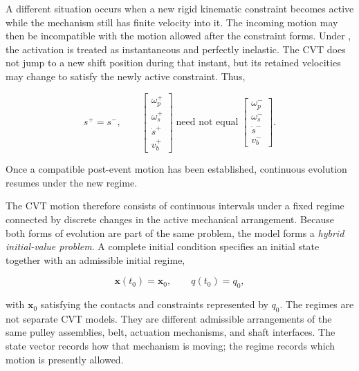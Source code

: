 \documentclass[11pt]{report}
\numberwithin{equation}{section}
\newcommand{\vect}[1]{\bm{#1}}
\newcounter{assump}
\begin{document}
A different situation occurs when a new rigid kinematic constraint becomes
active while the mechanism still has finite velocity into it. The incoming
motion may then be incompatible with the motion allowed after the constraint
forms. Under , the activation is
treated as instantaneous and perfectly inelastic. The CVT does not jump to a 
new shift position during that instant, but its retained velocities may change 
to satisfy the newly active constraint. Thus,

\begin{equation}
    s^{+}=s^{-},
    \qquad
    \begin{bmatrix}
        \omega_p^{+}\\
        \omega_s^{+}\\
        \dot{s}^{+}\\
        v_b^{+}
    \end{bmatrix}
    \;\text{need not equal}\;
    \begin{bmatrix}
        \omega_p^{-}\\
        \omega_s^{-}\\
        \dot{s}^{-}\\
        v_b^{-}
    \end{bmatrix}.
    \label{eq:impulsive_regime_transition}
\end{equation}

Once a compatible post-event motion has been established, continuous evolution 
resumes under the new regime.

The CVT motion therefore consists of continuous intervals under a fixed regime
connected by discrete changes in the active mechanical arrangement. Because
both forms of evolution are part of the same problem, the model forms a
\emph{hybrid initial-value problem}. A complete initial condition specifies an
initial state together with an admissible initial regime,

\begin{equation}
    \vect{x}(t_0)=\vect{x}_0,
    \qquad
    q(t_0)=q_0,
    \label{eq:hybrid_initial_condition}
\end{equation}

with \(\vect{x}_0\) satisfying the contacts and constraints represented by
\(q_0\). The regimes are not separate CVT models. They are different
admissible arrangements of the same pulley assemblies, belt, actuation
mechanisms, and shaft interfaces. The state vector records how that mechanism
is moving; the regime records which motion is presently allowed.
\end{document}
